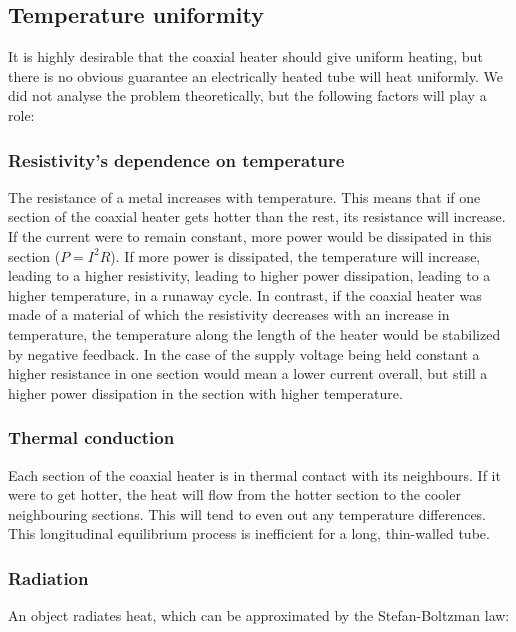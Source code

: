 \subsection{Temperature uniformity}
\label{sec:Uniformity}

It is highly desirable that the coaxial heater should give uniform heating, but
there is no obvious guarantee an electrically heated tube will heat uniformly.
We did not analyse the problem theoretically, but the following factors will
play a role:

\subsubsection{Resistivity's dependence on temperature}

The resistance of a metal increases with temperature. This means that if one
section of the coaxial heater gets hotter than the rest, its resistance
will increase. If the current were to remain constant, more power would be
dissipated in this section (\(P=I^2R\)). If more power is dissipated, the
temperature will increase, leading to a higher resistivity, leading to higher
power dissipation, leading to a higher temperature, in a runaway cycle. In
contrast, if the coaxial heater was made of a material of which the resistivity
decreases with an increase in temperature, the temperature along the length of
the heater would be stabilized by negative feedback. In the case of the supply
voltage being held constant a higher resistance in one section would mean a
lower current overall, but still a higher power dissipation in the section with
higher temperature.

\subsubsection{Thermal conduction}

Each section of the coaxial heater is in thermal contact with its neighbours. If
it were to get hotter, the heat will flow from the hotter section to the cooler
neighbouring sections. This will tend to even out any temperature differences.
This longitudinal equilibrium process is inefficient for a long, thin-walled
tube.

\subsubsection{Radiation}

An object radiates heat, which can be approximated by the Stefan-Boltzman law:

